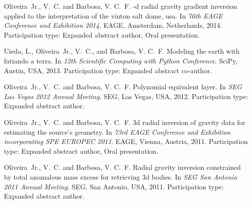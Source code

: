 \begin{thebibliography}{10}
Oliveira~Jr., V.~C. and Barbosa, V. C.~F.
-d radial gravity gradient inversion applied to the interpretation
  of the vinton salt dome, usa.
\newblock In \emph{76th EAGE Conference and Exhibition 2014}. EAGE, Amsterdam,
  Netherlands, 2014.
\newblock Participation type: Expanded abstract author, Oral presentation.

Uieda, L., Oliveira~Jr., V.~C., and Barbosa, V. C.~F.
\newblock Modeling the earth with fatiando a terra.
\newblock In \emph{12th Scientific Computing with Python Conference}. SciPy,
  Austin, USA, 2013.
\newblock Participation type: Expanded abstract co-author.

Oliveira~Jr., V.~C. and Barbosa, V. C.~F.
\newblock Polynomial equivalent layer.
\newblock In \emph{SEG Las Vegas 2012 Annual Meeting}. SEG, Las Vegas, USA,
  2012.
\newblock Participation type: Expanded abstract author.

Oliveira~Jr., V.~C. and Barbosa, V. C.~F.
\newblock 3d radial inversion of gravity data for estimating the source's
  geometry.
\newblock In \emph{73rd EAGE Conference and Exhibition incorporating SPE EUROPEC
  2011}. EAGE, Vienna, Austria, 2011{}.
\newblock Participation type: Expanded abstract author, Oral presentation.

Oliveira~Jr., V.~C. and Barbosa, V. C.~F.
\newblock Radial gravity inversion constrained by total anomalous mass excess
  for retrieving 3d bodies.
\newblock In \emph{SEG San Antonio 2011 Annual Meeting}. SEG, San Antonio, USA,
  2011{}.
\newblock Participation type: Expanded abstract author.

\end{thebibliography}
